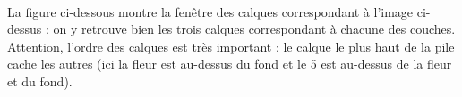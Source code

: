\begin{minipage}[c]{.22\textwidth}
\centering%
\end{minipage}\\[12pt]
\begin{minipage}[c]{.22\textwidth}
\end{minipage}\hfill%
\begin{minipage}[c]{.22\textwidth}
\end{minipage}\hfill%
\begin{minipage}[c]{.22\textwidth}
\end{minipage}\hfill%
\begin{minipage}[c]{.22\textwidth}
\end{minipage}


\vspace{12pt}

La figure ci-dessous montre la fenêtre des calques correspondant à l'image ci-dessus : on y retrouve bien les trois calques correspondant à chacune des couches. Attention, l'ordre des calques est très important : le calque le plus haut de la pile cache les autres (ici la fleur est au-dessus du fond et le 5 est au-dessus de la fleur et du fond).

